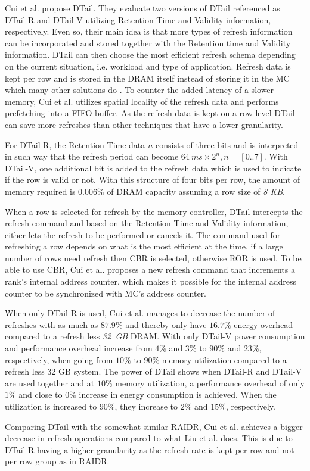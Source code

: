 Cui et al. \cite{dtail} propose DTail. They evaluate two versions of DTail referenced as DTail-R and DTail-V utilizing Retention Time and Validity information, respectively. Even so, their main idea is that more types of refresh information can be incorporated and stored together with the Retention time and Validity information. DTail can then choose the most efficient refresh schema depending on the current situation, i.e. workload and type of application. Refresh data is kept per row and is stored in the DRAM itself instead of storing it in the MC which many other solutions do \cite{raidr}\cite{smartrefresh}\cite{refrint}. To counter the added latency of a slower memory, Cui et al. utilizes spatial locality of the refresh data and performs prefetching into a FIFO buffer. As the refresh data is kept on a row level DTail can save more refreshes than other techniques that have a lower granularity.

For DTail-R, the Retention Time data $n$ consists of three bits and is interpreted in such way that the refresh period can become \(64\:ms \times 2^n, n = [0..7]\). With DTail-V, one additional bit is added to the refresh data which is used to indicate if the row is valid or not. With this structure of four bits per row, the amount of memory required is $0.006\%$ of DRAM capacity assuming a row size of \textit{8 KB}.

When a row is selected for refresh by the memory controller, DTail intercepts the refresh command and based on the Retention Time and Validity information, either lets the refresh to be performed or cancels it. The command used for refreshing a row depends on what is the most efficient at the time, if a large number of rows need refresh then CBR is selected, otherwise ROR is used. To be able to use CBR, Cui et al. proposes a new refresh command that increments a rank's internal address counter, which makes it possible for the internal address counter to be synchronized with MC's address counter.

When only DTail-R is used, Cui et al. manages to decrease the number of refreshes with as much as $87.9\%$ and thereby only have $16.7\%$ energy overhead compared to a refresh less \textit{32~GB} DRAM. With only DTail-V power consumption and performance overhead increase from $4\%$ and $3\%$ to $90\%$ and $23\%$, respectively, when going from $10\%$ to $90\%$ memory utilization compared to a refresh less 32 GB system. The power of DTail shows when DTail-R and DTail-V are used together and at $10\%$ memory utilization, a performance overhead of only $1\%$ and close to $0\%$ increase in energy consumption is achieved. When the utilization is increased to $90\%$, they increase to $2\%$ and $15\%$, respectively.

Comparing DTail with the somewhat similar RAIDR, Cui et al. achieves a bigger decrease in refresh operations compared to what Liu et al. does. This is due to DTail-R having a higher granularity as the refresh rate is kept per row and not per row group as in RAIDR.